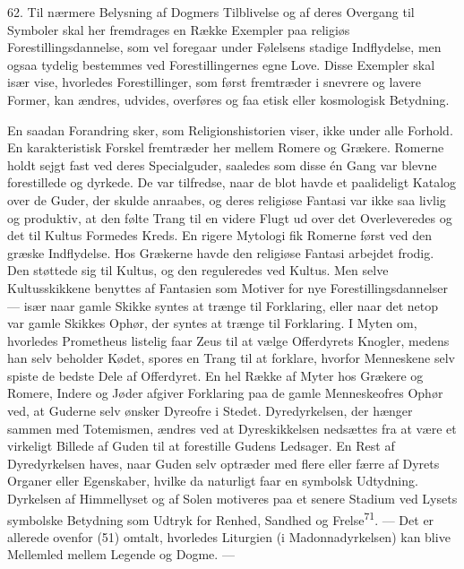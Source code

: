 \documentclass[12pt,a4paper,openany]{book}
\newcommand{\opage}[1]{\marginnote{\footnotesize\textit{[#1]}}}
\begin{document}
62. Til nærmere Belysning af Dogmers Tilblivelse og af deres Overgang
til Symboler skal her fremdrages en Række Exempler paa religiøs
Forestillingsdannelse, som vel foregaar under Følelsens stadige
Indflydelse, men ogsaa tydelig bestemmes ved Forestillingernes egne
Love. Disse Exempler skal især vise, hvorledes Forestillinger, som først
fremtræder i snevrere og lavere Former, kan ændres, udvides, overføres
og faa etisk eller kosmologisk Betydning.

En saadan Forandring sker, som Religionshistorien viser, ikke under alle
Forhold. En karakteristisk Forskel fremtræder her mellem Romere og
Grækere. Romerne holdt sejgt fast ved deres Specialguder, saaledes som
disse én Gang var blevne forestillede og dyrkede. De var tilfredse, naar
de blot havde et paalideligt Katalog over de Guder, der skulde anraabes,
og deres religiøse Fantasi var ikke saa livlig og produktiv, at den
følte Trang til en videre Flugt ud over det Overleveredes og det til
Kultus Formedes Kreds. En rigere Mytologi fik Romerne først ved den
græske Indflydelse. Hos Grækerne havde den religiøse Fantasi arbejdet
frodig. Den støttede sig til Kultus, og den reguleredes ved Kultus. Men
selve Kultusskikkene benyttes af Fantasien som Motiver for nye
Forestillingsdannelser --- især naar gamle Skikke syntes at trænge til
Forklaring, eller naar det netop var gamle Skikkes Ophør, der syntes at
trænge til Forklaring. I Myten om, hvorledes Prometheus listelig faar
Zeus til at vælge Offerdyrets Knogler, medens han selv beholder Kødet,
spores en Trang til at forklare, hvorfor Menneskene selv spiste de
bedste Dele af Offerdyret. En hel Række af Myter hos Grækere og Romere,
Indere og Jøder afgiver Forklaring paa de gamle Menneskeofres Ophør ved,
at Guderne selv ønsker Dyreofre i Stedet. Dyredyrkelsen, der hænger
sammen med Totemismen, ændres ved at Dyreskikkelsen nedsættes fra at
være et virkeligt Billede af Guden til at forestille Gudens Ledsager. En
Rest af Dyredyrkelsen haves, naar Guden selv optræder med flere eller
færre af Dyrets Organer eller
\opage{142}Egenskaber, hvilke da naturligt faar en symbolsk Udtydning.
Dyrkelsen af Himmellyset og af Solen motiveres paa et senere Stadium ved
Lysets symbolske Betydning som Udtryk for Renhed, Sandhed og
Frelse\textsuperscript{71}. --- Det er allerede ovenfor (51) omtalt,
hvorledes Liturgien (i Madonnadyrkelsen) kan blive Mellemled mellem
Legende og Dogme. ---
\end{document}

